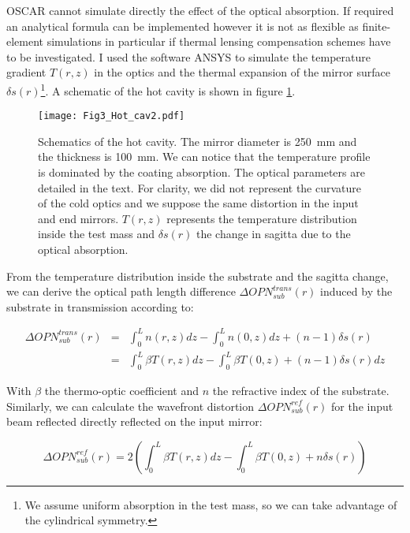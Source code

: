 OSCAR cannot simulate directly the effect of the optical absorption. If required an analytical formula can be implemented \cite{Hello321} however it is not as flexible as finite-element simulations in particular if thermal lensing compensation schemes have to be investigated. I used the software ANSYS to simulate the temperature gradient $T(r,z)$ in the optics and the thermal expansion of the mirror surface $\delta s(r)$\footnote{We assume uniform absorption in the test mass, so we can take advantage of the cylindrical symmetry.}. A schematic of the hot cavity is shown in figure \ref{fig3:hotcav}.

\begin{figure}
\begin{center}
\texttt{[image: Fig3\_Hot\_cav2.pdf]}
\end{center}
\caption{\label{fig3:hotcav} Schematics of the hot cavity. The mirror diameter is 250~mm and the thickness is 100~mm. We can notice that the temperature profile is dominated by the coating absorption. The optical parameters are detailed in the text. For clarity, we did not represent the curvature of the cold optics and we suppose the same distortion in the input and end mirrors. $T(r,z)$ represents the temperature distribution inside the test mass and $\delta s(r)$ the change in sagitta due to the optical absorption.}
\end{figure}

From the temperature distribution inside the substrate and the sagitta change, we can derive the optical path length difference $\Delta OPN_{sub}^{trans}(r)$ induced by the substrate in transmission according to:

\begin{eqnarray}\label{eq3:OPN1}
  \Delta OPN_{sub}^{trans}(r) &=& \int_0^L n(r,z) dz - \int_0^L n(0,z) dz + (n-1)\delta s(r) \nonumber \\
                &=&  \int_0^L \beta T(r,z) dz - \int_0^L \beta T(0,z) + (n-1)\delta s(r) dz
\end{eqnarray}

With $\beta$ the thermo-optic coefficient and $n$ the refractive index of the substrate. Similarly, we can calculate the wavefront distortion $\Delta OPN_{sub}^{ref}(r)$ for the input beam reflected directly reflected on the input mirror:

\begin{equation}\label{eq3:OPN2}
  \Delta OPN_{sub}^{ref}(r) = 2\left( \int_0^L \beta T(r,z) dz - \int_0^L \beta T(0,z) + n\delta s(r) \right)
\end{equation}

